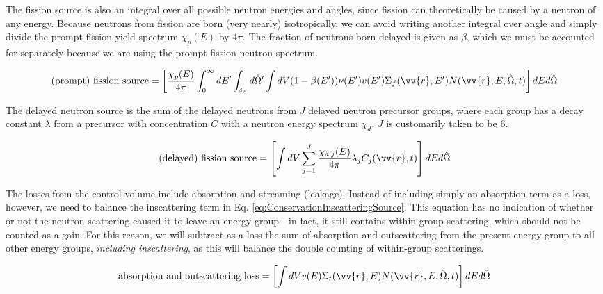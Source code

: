 \documentclass[10pt]{article}
\begin{document}
\begin{flushleft}
The fission source is also an integral over all possible neutron energies and angles, since fission can theoretically be caused by a neutron of any energy. Because neutrons from fission are born (very nearly) isotropically, we can avoid writing another integral over angle and simply divide the prompt fission yield spectrum \(\chi_p(E)\) by \(4\pi\). The fraction of neutrons born delayed is given as \(\beta\), which we must be accounted for separately because we are using the prompt fission neutron spectrum.

\begin{equation}
\label{eq:ConservationFissionPrompt}
\textrm{(prompt) fission source} = \left\lbrack\frac{\chi_p(E)}{4\pi} \int_{0}^{\infty} dE'\int_{4\pi}^{} d\hat{\Omega}'\int dV (1-\beta(E'))\nu(E')v(E')\Sigma_f(\vv{r},E')N(\vv{r}, E, \hat{\Omega},t)\right\rbrack dEd\hat{\Omega}
\end{equation}

The delayed neutron source is the sum of the delayed neutrons from \(J\) delayed neutron precursor groups, where each group has a decay constant \(\lambda\) from a precursor with concentration \(C\) with a neutron energy spectrum \(\chi_d\). \(J\) is customarily taken to be 6.

\begin{equation}
\label{eq:ConservationFissionDelayed}
\textrm{(delayed) fission source} = \left\lbrack\int dV \sum_{j=1}^{J} \frac{\chi_{d,j}(E)}{4\pi} \lambda_j C_j(\vv{r}, t)\right\rbrack dEd\hat{\Omega}
\end{equation}

The losses from the control volume include absorption and streaming (leakage). Instead of including simply an absorption term as a loss, however, we need to balance the inscattering term in Eq. \ref{eq:ConservationInscatteringSource}. This equation has no indication of whether or not the neutron scattering caused it to leave an energy group - in fact, it still contains within-group scattering, which should not be counted as a gain. For this reason, we will subtract as a loss the sum of absorption and outscattering from the present energy group to all other energy groups, \textit{including inscattering}, as this will balance the double counting of within-group scatterings. 

\begin{equation}
\label{eq:ConservationTotal}
\textrm{absorption and outscattering loss}=\left\lbrack\int dV v(E)\Sigma_t(\vv{r}, E) N(\vv{r}, E, \hat{\Omega},t)\right\rbrack dEd\hat{\Omega}
\end{equation}


\end{flushleft}
\end{document}
